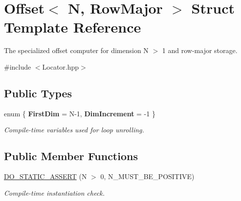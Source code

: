 \hypertarget{struct_d_o_1_1_offset_3_01_n_00_01_row_major_01_4}{\section{Offset$<$ N, Row\-Major $>$ Struct Template Reference}
\label{struct_d_o_1_1_offset_3_01_n_00_01_row_major_01_4}
}


The specialized offset computer for dimension N $>$ 1 and row-\/major storage.  




{\ttfamily \#include $<$Locator.\-hpp$>$}

\subsection*{Public Types}
\begin{DoxyCompactItemize}
\item 
enum \{ {\bfseries First\-Dim} = N-\/1, 
{\bfseries Dim\-Increment} = -\/1
 \}
\begin{DoxyCompactList}\small\item\em Compile-\/time variables used for loop unrolling. \end{DoxyCompactList}\end{DoxyCompactItemize}
\subsection*{Public Member Functions}
\begin{DoxyCompactItemize}
\item 
\hypertarget{struct_d_o_1_1_offset_3_01_n_00_01_row_major_01_4_a2b745a93d3b7a3bf968d6839047f5774}{\hyperlink{struct_d_o_1_1_offset_3_01_n_00_01_row_major_01_4_a2b745a93d3b7a3bf968d6839047f5774}{D\-O\-\_\-\-S\-T\-A\-T\-I\-C\-\_\-\-A\-S\-S\-E\-R\-T} (N $>$ 0, N\-\_\-\-M\-U\-S\-T\-\_\-\-B\-E\-\_\-\-P\-O\-S\-I\-T\-I\-V\-E)}\label{struct_d_o_1_1_offset_3_01_n_00_01_row_major_01_4_a2b745a93d3b7a3bf968d6839047f5774}

\begin{DoxyCompactList}\small\item\em Compile-\/time instantiation check. \end{DoxyCompactList}\end{DoxyCompactItemize}
